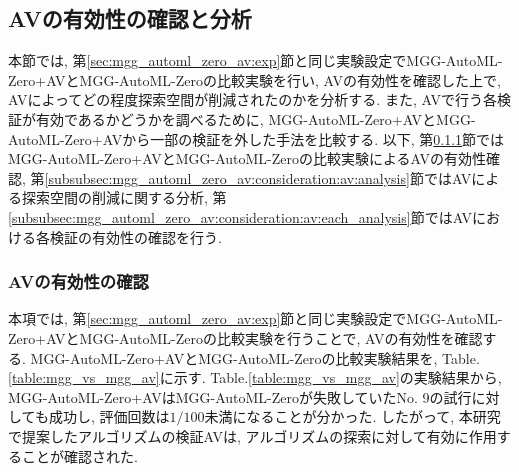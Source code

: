 \documentclass[11pt,oneside,openany,report]{jsbook}
\begin{document}
\subsection{AVの有効性の確認と分析}\label{subsec:mgg_automl_zero_av:consideration:av}

本節では, 第\ref{sec:mgg_automl_zero_av:exp}節と同じ実験設定でMGG-AutoML-Zero+AVとMGG-AutoML-Zeroの比較実験を行い, AVの有効性を確認した上で, AVによってどの程度探索空間が削減されたのかを分析する. また, AVで行う各検証が有効であるかどうかを調べるために, MGG-AutoML-Zero+AVとMGG-AutoML-Zero+AVから一部の検証を外した手法を比較する. 以下, 第\ref{subsubsec:mgg_automl_zero_av:consideration:av:effect}節ではMGG-AutoML-Zero+AVとMGG-AutoML-Zeroの比較実験によるAVの有効性確認, 第\ref{subsubsec:mgg_automl_zero_av:consideration:av:analysis}節ではAVによる探索空間の削減に関する分析, 第\ref{subsubsec:mgg_automl_zero_av:consideration:av:each_analysis}節ではAVにおける各検証の有効性の確認を行う.

\subsubsection{AVの有効性の確認}\label{subsubsec:mgg_automl_zero_av:consideration:av:effect}

本項では, 第\ref{sec:mgg_automl_zero_av:exp}節と同じ実験設定でMGG-AutoML-Zero+AVとMGG-AutoML-Zeroの比較実験を行うことで, AVの有効性を確認する. MGG-AutoML-Zero+AVとMGG-AutoML-Zeroの比較実験結果を, Table.\ref{table:mgg_vs_mgg_av}に示す. Table.\ref{table:mgg_vs_mgg_av}の実験結果から, MGG-AutoML-Zero+AVはMGG-AutoML-Zeroが失敗していたNo. 9の試行に対しても成功し, 評価回数は$1/100$未満になることが分かった. したがって, 本研究で提案したアルゴリズムの検証AVは, アルゴリズムの探索に対して有効に作用することが確認された.
\end{document}
